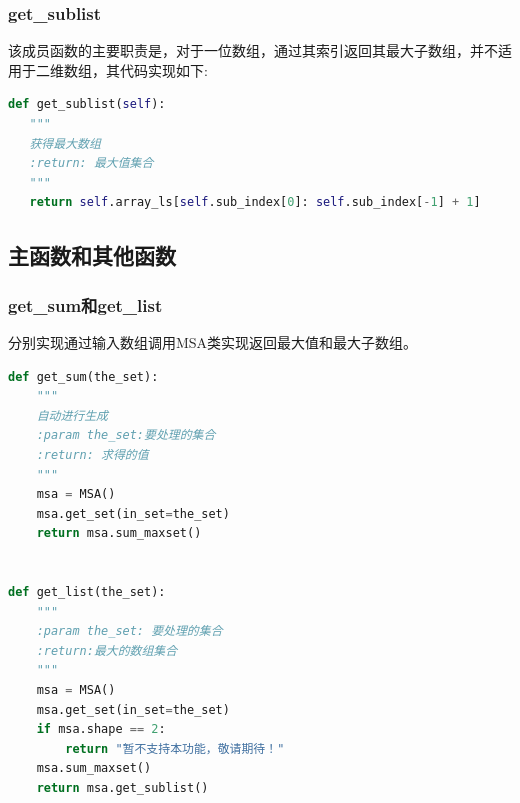 \documentclass{article}
\begin{document}
\subsubsection{get\_sublist}
该成员函数的主要职责是，对于一位数组，通过其索引返回其最大子数组，并不适用于二维数组，其代码实现如下:
\begin{lstlisting}[language = python]
def get_sublist(self):
   """
   获得最大数组
   :return: 最大值集合
   """
   return self.array_ls[self.sub_index[0]: self.sub_index[-1] + 1]
\end{lstlisting}
\subsection{主函数和其他函数}
\subsubsection{get\_sum和get\_list}
分别实现通过输入数组调用MSA类实现返回最大值和最大子数组。
\begin{lstlisting}[language = python]
def get_sum(the_set):
    """
    自动进行生成
    :param the_set:要处理的集合
    :return: 求得的值
    """
    msa = MSA()
    msa.get_set(in_set=the_set)
    return msa.sum_maxset()


def get_list(the_set):
    """
    :param the_set: 要处理的集合
    :return:最大的数组集合
    """
    msa = MSA()
    msa.get_set(in_set=the_set)
    if msa.shape == 2:
        return "暂不支持本功能，敬请期待！"
    msa.sum_maxset()
    return msa.get_sublist()
\end{lstlisting}
\end{document}
